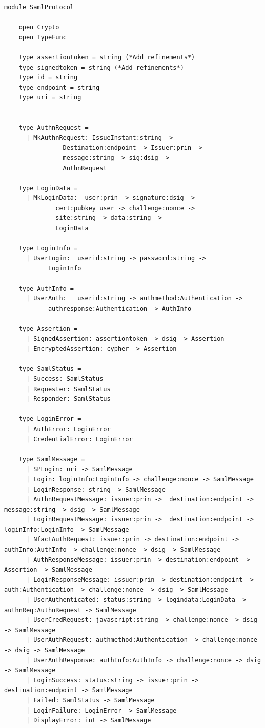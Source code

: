 \documentclass[twosided]{report}
\begin{document}
\begin{lstlisting}[style=fstar, caption={Specification of the SAML Protocol elements}]
	module SamlProtocol
	
	open Crypto
	open TypeFunc

	type assertiontoken = string (*Add refinements*)
	type signedtoken = string (*Add refinements*)
	type id = string
	type endpoint = string
	type uri = string


	type AuthnRequest = 
	  | MkAuthnRequest: IssueInstant:string ->
			    Destination:endpoint -> Issuer:prin ->
			    message:string -> sig:dsig ->
			    AuthnRequest

	type LoginData = 
	  | MkLoginData:  user:prin -> signature:dsig ->
			  cert:pubkey user -> challenge:nonce ->
			  site:string -> data:string ->
			  LoginData

	type LoginInfo =
	  | UserLogin:  userid:string -> password:string ->
			LoginInfo

	type AuthInfo =
	  | UserAuth:   userid:string -> authmethod:Authentication ->
			authresponse:Authentication -> AuthInfo

	type Assertion =
	  | SignedAssertion: assertiontoken -> dsig -> Assertion
	  | EncryptedAssertion: cypher -> Assertion

	type SamlStatus =
	  | Success: SamlStatus
	  | Requester: SamlStatus
	  | Responder: SamlStatus

	type LoginError =
	  | AuthError: LoginError
	  | CredentialError: LoginError

	type SamlMessage =
	  | SPLogin: uri -> SamlMessage
	  | Login: loginInfo:LoginInfo -> challenge:nonce -> SamlMessage
	  | LoginResponse: string -> SamlMessage
	  | AuthnRequestMessage: issuer:prin ->  destination:endpoint -> message:string -> dsig -> SamlMessage
	  | LoginRequestMessage: issuer:prin ->  destination:endpoint -> loginInfo:LoginInfo -> SamlMessage 
	  | NfactAuthRequest: issuer:prin -> destination:endpoint -> authInfo:AuthInfo -> challenge:nonce -> dsig -> SamlMessage
	  | AuthResponseMessage: issuer:prin -> destination:endpoint -> Assertion -> SamlMessage
	  | LoginResponseMessage: issuer:prin -> destination:endpoint -> auth:Authentication -> challenge:nonce -> dsig -> SamlMessage
	  | UserAuthenticated: status:string -> logindata:LoginData -> authnReq:AuthnRequest -> SamlMessage
	  | UserCredRequest: javascript:string -> challenge:nonce -> dsig -> SamlMessage
	  | UserAuthRequest: authmethod:Authentication -> challenge:nonce -> dsig -> SamlMessage
	  | UserAuthResponse: authInfo:AuthInfo -> challenge:nonce -> dsig -> SamlMessage
	  | LoginSuccess: status:string -> issuer:prin -> destination:endpoint -> SamlMessage
	  | Failed: SamlStatus -> SamlMessage
	  | LoginFailure: LoginError -> SamlMessage
	  | DisplayError: int -> SamlMessage



\end{lstlisting}
\end{document}
